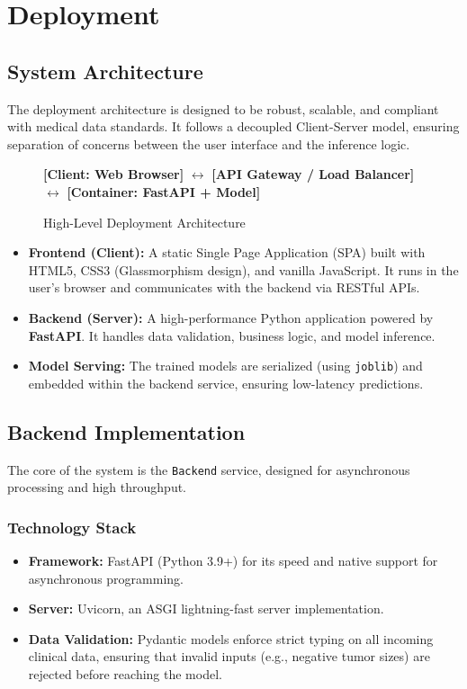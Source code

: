 \chapter{Deployment}

\section{System Architecture}
The deployment architecture is designed to be robust, scalable, and compliant with medical data standards. It follows a decoupled Client-Server model, ensuring separation of concerns between the user interface and the inference logic.

\begin{figure}[h]
    \centering
    \textbf{[Client: Web Browser]} $\longleftrightarrow$ \textbf{[API Gateway / Load Balancer]} $\longleftrightarrow$ \textbf{[Container: FastAPI + Model]}
    \caption{High-Level Deployment Architecture}
\end{figure}

\begin{itemize}
    \item \textbf{Frontend (Client):} A static Single Page Application (SPA) built with HTML5, CSS3 (Glassmorphism design), and vanilla JavaScript. It runs in the user's browser and communicates with the backend via RESTful APIs.
    \item \textbf{Backend (Server):} A high-performance Python application powered by \textbf{FastAPI}. It handles data validation, business logic, and model inference.
    \item \textbf{Model Serving:} The trained models are serialized (using \texttt{joblib}) and embedded within the backend service, ensuring low-latency predictions.
\end{itemize}

\section{Backend Implementation}
The core of the system is the \texttt{Backend} service, designed for asynchronous processing and high throughput.

\subsection{Technology Stack}
\begin{itemize}
    \item \textbf{Framework:} FastAPI (Python 3.9+) for its speed and native support for asynchronous programming.
    \item \textbf{Server:} Uvicorn, an ASGI lightning-fast server implementation.
    \item \textbf{Data Validation:} Pydantic models enforce strict typing on all incoming clinical data, ensuring that invalid inputs (e.g., negative tumor sizes) are rejected before reaching the model.
\end{itemize}

